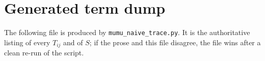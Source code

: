 \documentclass[11pt]{article}
\begin{document}
\section{Generated term dump}
\label{app:term-dump}

The following file is produced by \texttt{mumu\_naive\_trace.py}. It is the
authoritative listing of every $T_{ij}$ and of $S$; if the prose and this
file disagree, the file wins after a clean re-run of the script.


\end{document}
